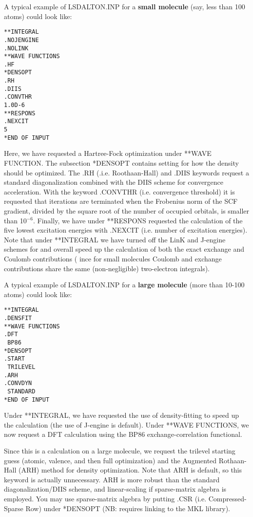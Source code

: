 A typical example of LSDALTON.INP for a {\bf small molecule} (say, less than 100 atoms) could look like:
\begin{verbatim}
**INTEGRAL
.NOJENGINE
.NOLINK
**WAVE FUNCTIONS
.HF
*DENSOPT
.RH
.DIIS
.CONVTHR
1.0D-6
**RESPONS
.NEXCIT
5
*END OF INPUT
\end{verbatim}
Here, we have requested a Hartree-Fock optimization under **WAVE FUNCTION. The subsection
*DENSOPT contains setting for how the density should be optimized. The .RH (.i.e. Roothaan-Hall)
and .DIIS keywords request a standard diagonalization combined with the DIIS scheme for convergence
acceleration. With the keyword .CONVTHR (i.e. convergence threshold) 
it is requested that iterations are terminated when the 
Frobenius norm of the SCF gradient, divided by the square root of the number of occupied orbitals, 
is smaller than 10$^{-6}$. Finally, we have under **RESPONS requested
the calculation of the five lowest excitation energies with .NEXCIT (i.e. number of excitation energies).
Note that under **INTEGRAL we have turned off the LinK and J-engine schemes for and overall 
speed up the calculation of both the exact exchange and Coulomb contributions ( ince for small 
molecules Coulomb and exchange contributions share the same (non-negligible) two-electron 
integrals).

A typical example of LSDALTON.INP for a {\bf large molecule} (more than 10-100 atoms) could look like: 
\begin{verbatim}
**INTEGRAL
.DENSFIT
**WAVE FUNCTIONS
.DFT
 BP86
*DENSOPT
.START
 TRILEVEL
.ARH
.CONVDYN
 STANDARD
*END OF INPUT
\end{verbatim}
Under **INTEGRAL, we have requested the use of density-fitting to speed up the calculation (the use of J-engine is default). 
Under **WAVE FUNCTIONS, we now request a DFT
calculation using the BP86 exchange-correlation functional.

Since this is a calculation on a large molecule, 
we request the trilevel starting guess (atomic, valence, and then full
optimization) and the Augmented Rothaan-Hall (ARH) method for density optimization. 
Note that ARH is default, so this keyword is actually unnecessary.
ARH is more robust than the standard diagonalization/DIIS scheme, and linear-scaling if sparse-matrix algebra is employed. You may use
sparse-matrix algebra by putting .CSR (i.e. Compressed-Sparse Row) under *DENSOPT (NB: requires linking to the MKL library). 

